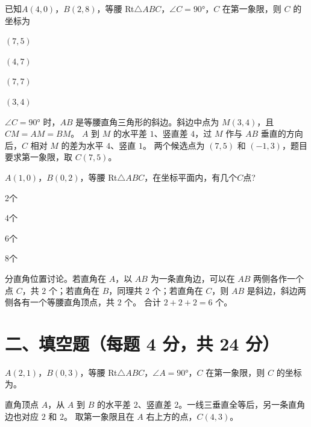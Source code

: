 \documentclass{exam-zh}
\begin{document}
\begin{question}[points=3]
  已知$A(4, 0)$，$B(2, 8)$，等腰 Rt$\triangle ABC$，$\angle C = 90°$，$C$ 在第一象限，则 $C$ 的坐标为
  \begin{choices}
    \item $(7, 5)$
    \item $(4, 7)$
    \item $(7, 7)$
    \item $(3, 4)$
  \end{choices}
  \paren[A]
  \begin{solutionblock}
    $\angle C=90°$ 时，$AB$ 是等腰直角三角形的斜边。斜边中点为 $M(3,4)$，且 $CM=AM=BM$。
    $A$ 到 $M$ 的水平差 $1$、竖直差 $4$，过 $M$ 作与 $AB$ 垂直的方向后，$C$ 相对 $M$ 的差为水平 $4$、竖直 $1$。
    两个候选点为 $(7,5)$ 和 $(-1,3)$，题目要求第一象限，取 $C(7,5)$。
  \end{solutionblock}
\end{question}



\begin{question}[points=3]
  $A(1, 0)$，$B(0, 2)$，等腰 Rt$\triangle ABC$，在坐标平面内，有几个$C$点?
  \begin{choices}
    \item 2个
    \item 4个
    \item 6个
    \item 8个
  \end{choices}
  \paren[C]
  \begin{solutionblock}
    分直角位置讨论。若直角在 $A$，以 $AB$ 为一条直角边，可以在 $AB$ 两侧各作一个点 $C$，共 $2$ 个；若直角在 $B$，同理共 $2$ 个；若直角在 $C$，则 $AB$ 是斜边，斜边两侧各有一个等腰直角顶点，共 $2$ 个。
    合计 $2+2+2=6$ 个。
  \end{solutionblock}
\end{question}


\section*{二、填空题（每题 4 分，共 24 分）}


\begin{question}[points=4]
  $A(2, 1)$，$B(0, 3)$，等腰 Rt$\triangle ABC$，$\angle A = 90°$，$C$ 在第一象限，则 $C$ 的坐标为\fillin。
  \paren[$(4,\,3)$]
  \begin{solutionblock}
    直角顶点 $A$，从 $A$ 到 $B$ 的水平差 $2$、竖直差 $2$。一线三垂直全等后，另一条直角边也对应 $2$ 和 $2$。
    取第一象限且在 $A$ 右上方的点，$C(4,3)$。
  \end{solutionblock}
\end{question}
\end{document}
